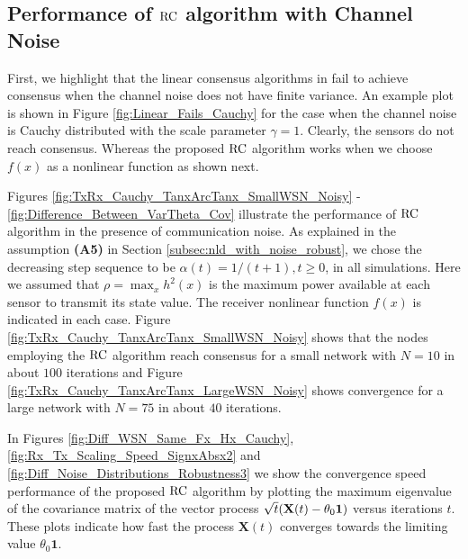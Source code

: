 \documentclass[onecolumn, draft, 12pt]{IEEEtran}
\newcommand{\rnld}{\rm RC}
\newcommand{\onevect}{\mathbf{1}}
\begin{document}
\subsection{Performance of $\rnld$ algorithm with Channel Noise}\label{subsec:perf_nld_withs_noise_robust}
First, we highlight that the linear consensus algorithms in \cite{Boyd2007,Touri2009,MinyiHuang2007,Pescosolido2008,Barbarossa2008,MinyiHuang2008,AysalBarner2010,Nedic2011cvx, KarMoura2009,KarMoura2007} fail to achieve consensus when the channel noise does not have finite variance. An example plot is shown in Figure \ref{fig:Linear_Fails_Cauchy} for the case when the channel noise is Cauchy distributed with the scale parameter $\gamma=1$. Clearly, the sensors do not reach consensus. Whereas the proposed $\rnld$ algorithm works when we choose $f(x)$ as a nonlinear function as shown next. 

Figures \ref{fig:TxRx_Cauchy_TanxArcTanx_SmallWSN_Noisy} - \ref{fig:Difference_Between_VarTheta_Cov} illustrate the performance of $\rnld$ algorithm in the presence of communication noise. As explained in the assumption \textbf{(A5)} in Section \ref{subsec:nld_with_noise_robust}, we chose the decreasing step sequence to be $\alpha(t)=1/(t+1), t \geq 0$, in all simulations. Here we assumed that $\rho=\max_{x} h^{2}(x)$ is the maximum power available at each sensor to transmit its state value. The receiver nonlinear function $f(x)$ is indicated in each case. Figure \ref{fig:TxRx_Cauchy_TanxArcTanx_SmallWSN_Noisy} shows that the nodes employing the $\rnld$ algorithm reach consensus for a small network with $N=10$ in about $100$ iterations and Figure \ref{fig:TxRx_Cauchy_TanxArcTanx_LargeWSN_Noisy} shows convergence for a large network with $N=75$ in about $40$ iterations.  

In Figures \ref{fig:Diff_WSN_Same_Fx_Hx_Cauchy}, \ref{fig:Rx_Tx_Scaling_Speed_SignxAbsx2} and \ref{fig:Diff_Noise_Distributions_Robustness3} we show the convergence speed performance of the proposed $\rnld$ algorithm by plotting the maximum eigenvalue of the covariance matrix of the vector process $\sqrt{t}(\mathbf{X}(t)- \theta_0 \bf{1})$ versus iterations $t$. These plots indicate how fast the process $\mathbf{X}(t)$ converges towards the limiting value $\theta_0 \onevect$. 
\end{document}
